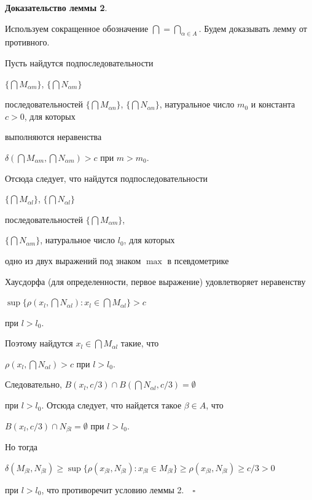 {\bf Доказательство леммы 2}.


Используем сокращенное обозначение $\bigcap = \bigcap


\limits_{\alpha \in A}$. Будем доказывать лемму от противного.


Пусть найдутся подпоследовательности


$\{\bigcap M_{\alpha m}\}$, $\{\bigcap N_{\alpha m}\}$


последовательностей $\{\bigcap M_{\alpha n}\}$, $\{\bigcap 


N_{\alpha n}\}$, натуральное число $m_{0}$ и константа $c > 0$, для которых 


выполняются неравенства


$\delta (\bigcap M_{\alpha m},\bigcap N_{\alpha m}) > c$ при $m > m_{0}$.


Отсюда следует, что найдутся подпоследовательности


$\{\bigcap M_{\alpha l}\}$, $\{\bigcap N_{\alpha l}\}$ 


последовательностей $\{\bigcap M_{\alpha m}\}$,


$\{\bigcap N_{\alpha m}\}$, натуральное число $l_{0}$, для которых


одно из двух выражений под знаком $\max$ в псевдометрике


Хаусдорфа (для определенности, первое выражение) удовлетворяет неравенству


$\sup\{\rho(x_{l},\bigcap N_{\alpha l}):x_{l}\in\bigcap M_{\alpha l}\}>c$


при $l > l_{0}$.


Поэтому найдутся $x_{l} \in \bigcap M_{\alpha l}$ такие, что 


$\rho(x_{l},\bigcap N_{\alpha l})


> c$ при $l > l_{0}$.


Следовательно, $B(x_{l},c/3) \cap B(\bigcap N_{\alpha l},c/3)=\emptyset$


при $l > l_{0}$. Отсюда следует, что найдется такое $\beta \in A$, что 


$B(x_{l},c/3) \cap N_{\beta l} = \emptyset$ при $l > l_{0}$. 


Но тогда


$\delta (M_{\beta l},N_{\beta l}) \geq \sup\{\rho(x_{\beta l},N_{\beta l}): 


x_{\beta l}\in M_{\beta l}\}\ge\rho(x_{\beta l},N_{\beta l}) \geq c/3>0$


при $l > l_{0}$, что противоречит условию леммы 2.$\quad\square$





